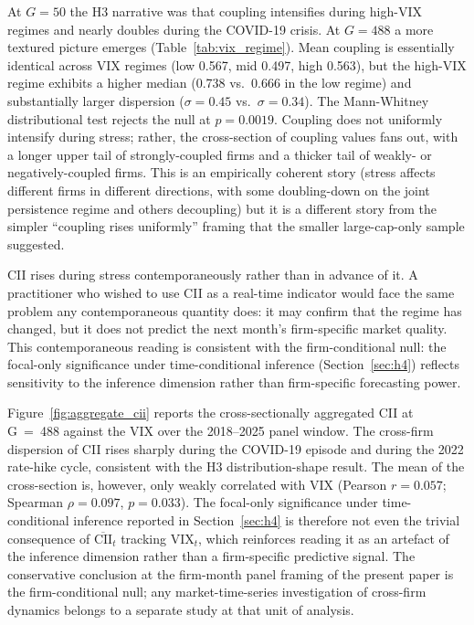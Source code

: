 \documentclass[preprint,12pt,authoryear]{elsarticle}
\begin{document}
At $G = 50$ the H3 narrative was that coupling intensifies during high-VIX regimes and nearly doubles during the COVID-19 crisis. At $G = 488$ a more textured picture emerges (Table~\ref{tab:vix_regime}). Mean coupling is essentially identical across VIX regimes (low 0.567, mid 0.497, high 0.563), but the high-VIX regime exhibits a higher median (0.738 vs.\ 0.666 in the low regime) and substantially larger dispersion ($\sigma = 0.45$ vs.\ $\sigma = 0.34$). The Mann-Whitney distributional test rejects the null at $p = 0.0019$. Coupling does not uniformly intensify during stress; rather, the cross-section of coupling values fans out, with a longer upper tail of strongly-coupled firms and a thicker tail of weakly- or negatively-coupled firms. This is an empirically coherent story (stress affects different firms in different directions, with some doubling-down on the joint persistence regime and others decoupling) but it is a different story from the simpler ``coupling rises uniformly'' framing that the smaller large-cap-only sample suggested.

CII rises during stress contemporaneously rather than in advance of it. A practitioner who wished to use CII as a real-time indicator would face the same problem any contemporaneous quantity does: it may confirm that the regime has changed, but it does not predict the next month's firm-specific market quality. This contemporaneous reading is consistent with the firm-conditional null: the focal-only significance under time-conditional inference (Section~\ref{sec:h4}) reflects sensitivity to the inference dimension rather than firm-specific forecasting power.

Figure~\ref{fig:aggregate_cii} reports the cross-sectionally aggregated CII at G~=~488 against the VIX over the 2018--2025 panel window. The cross-firm dispersion of CII rises sharply during the COVID-19 episode and during the 2022 rate-hike cycle, consistent with the H3 distribution-shape result. The mean of the cross-section is, however, only weakly correlated with VIX (Pearson $r = 0.057$; Spearman $\rho = 0.097$, $p = 0.033$). The focal-only significance under time-conditional inference reported in Section~\ref{sec:h4} is therefore not even the trivial consequence of $\overline{\text{CII}}_t$ tracking $\text{VIX}_t$, which reinforces reading it as an artefact of the inference dimension rather than a firm-specific predictive signal. The conservative conclusion at the firm-month panel framing of the present paper is the firm-conditional null; any market-time-series investigation of cross-firm dynamics belongs to a separate study at that unit of analysis.
\end{document}
